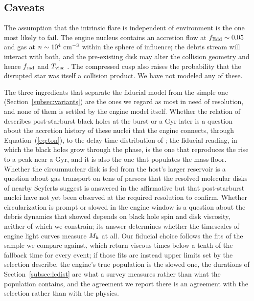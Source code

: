 \documentclass[twocolumn,pdftex]{aastex701}
\begin{document}
\subsection{Caveats}\label{subsec:caveats}

The assumption that the intrinsic flare is independent of environment is the one most likely to fail. The engine nucleus contains an accretion flow at $f_{\rm Edd} \sim 0.05$ and gas at $n \sim 10^{4}~{\rm cm}^{-3}$ within the sphere of influence; the debris stream will interact with both, and the pre-existing disk may alter the collision geometry and hence $f_{\rm rad}$ and $T_{\rm visc}$ \citep{Chan:2019a}. The compressed cusp also raises the probability that the disrupted star was itself a collision product. We have not modeled any of these.

The three ingredients that separate the fiducial model from the simple one (Section~\ref{subsec:variants}) are the ones we regard as most in need of resolution, and none of them is settled by the engine model itself. Whether the relation of \citet{Reines:2015a} describes post-starburst black holes at the burst or a Gyr later is a question about the accretion history of these nuclei that the engine connects, through Equation~(\ref{eq:ton}), to the delay time distribution of \citet{Shepherd:2026a}; the fiducial reading, in which the black holes grow through the phase, is the one that reproduces the rise to a peak near a Gyr, and it is also the one that populates the mass floor. Whether the circumnuclear disk is fed from the host's larger reservoir is a question about gas transport on tens of parsecs that the resolved molecular disks of nearby Seyferts \citep{GarciaBurillo:2021a} suggest is answered in the affirmative but that post-starburst nuclei have not yet been observed at the required resolution to confirm. Whether circularization is prompt or slowed in the engine window is a question about the debris dynamics that \citet{Guillochon:2015a} showed depends on black hole spin and disk viscosity, neither of which we constrain; its answer determines whether the timescales of engine light curves measure $M_{\rm h}$ at all. Our fiducial choice follows the fits of the sample we compare against, which return viscous times below a tenth of the fallback time for every event; if those fits are instead upper limits set by the selection \citet{Guillochon:2015a} describe, the engine's true population is the slowed one, the durations of Section~\ref{subsec:lcdist} are what a survey measures rather than what the population contains, and the agreement we report there is an agreement with the selection rather than with the physics.
\end{document}
